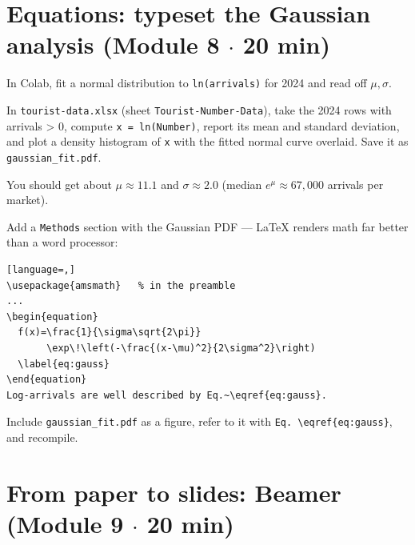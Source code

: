 \documentclass[11pt]{article}
\begin{document}
\section{Equations: typeset the Gaussian analysis \hfill {\normalfont\small (Module 8 $\cdot$ 20 min)}}

\begin{checklist}
\item In Colab, fit a normal distribution to \texttt{ln(arrivals)} for 2024 and read off $\mu,\sigma$.
\end{checklist}

\begin{promptbox}
In \texttt{tourist-data.xlsx} (sheet \texttt{Tourist-Number-Data}), take the 2024 rows with arrivals > 0,
compute \texttt{x = ln(Number)}, report its mean and standard deviation, and plot a density histogram of
\texttt{x} with the fitted normal curve overlaid. Save it as \texttt{gaussian\_fit.pdf}.
\end{promptbox}

\begin{checklist}
\item You should get about $\mu \approx 11.1$ and $\sigma \approx 2.0$ (median $e^{\mu}\approx 67{,}000$ arrivals per market).
\item Add a \texttt{Methods} section with the Gaussian PDF --- LaTeX renders math far better than a word processor:
\end{checklist}

\begin{lstlisting}[language=,]
\usepackage{amsmath}   % in the preamble
...
\begin{equation}
  f(x)=\frac{1}{\sigma\sqrt{2\pi}}
       \exp\!\left(-\frac{(x-\mu)^2}{2\sigma^2}\right)
  \label{eq:gauss}
\end{equation}
Log-arrivals are well described by Eq.~\eqref{eq:gauss}.
\end{lstlisting}

\begin{checklist}
\item Include \texttt{gaussian\_fit.pdf} as a figure, refer to it with \texttt{Eq.~\textbackslash eqref\{eq:gauss\}}, and recompile.
\end{checklist}

\section{From paper to slides: Beamer \hfill {\normalfont\small (Module 9 $\cdot$ 20 min)}}
\end{document}
